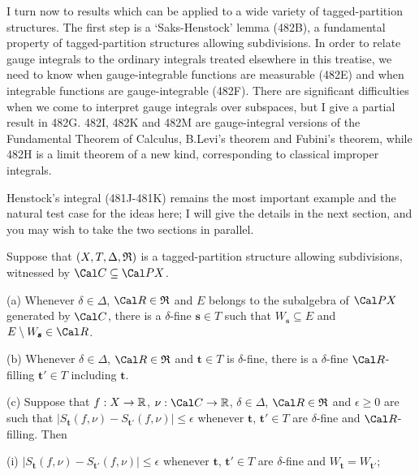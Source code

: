 
\def\closure{\mathop{\text{cl}}}
\def\Eta{\text{H}}

\def\chaptername{Gauge integrals}
\def\sectionname{General theory}


I turn now to results which can be applied to a wide variety of
tagged-partition structures.   The first step is a `Saks-Henstock'
lemma
(482B), a fundamental property of tagged-partition structures allowing
subdivisions.   In order to relate gauge integrals to the ordinary
integrals treated elsewhere in this treatise, we need to know when
gauge-integrable functions are measurable (482E) and when integrable
functions are gauge-integrable (482F).   There are significant
difficulties when we come to interpret gauge integrals over subspaces,
but I give a partial result in 482G.   482I, 482K and 482M
are gauge-integral versions of the Fundamental Theorem of Calculus,
B.Levi's theorem and Fubini's theorem, while 482H is a limit theorem of a
new kind, corresponding to classical improper integrals.

Henstock's integral (481J-481K) remains the most important example and
the natural test case for the ideas here;  I will give the details in
the next section, and you may wish to take the two sections in
parallel.

 Suppose that $(X,T,\Delta,\frak R)$ is a
tagged-partition structure allowing subdivisions,
witnessed by $\Cal C\subseteq\Cal PX$.

(a) Whenever $\delta\in\Delta$, $\Cal R\in\frak R$ and $E$ belongs to
the subalgebra of $\Cal PX$ generated by $\Cal C$, there is a
$\delta$-fine $\pmb{s}\in T$ such that $W_{\pmb{s}}\subseteq E$ and
$E\setminus W_{\pmb{s}}\in\Cal R$.

(b) Whenever $\delta\in\Delta$, $\Cal R\in\frak R$ and $\pmb{t}\in T$
is $\delta$-fine, there is a $\delta$-fine $\Cal R$-filling 
$\pmb{t}'\in T$ including $\pmb{t}$.

(c) Suppose that $f:X\to\Bbb R$, $\nu:\Cal C\to\Bbb R$,
$\delta\in\Delta$, $\Cal R\in\frak R$ and $\epsilon\ge 0$ are such
that
$|S_{\pmb{t}}(f,\nu)-S_{\pmb{t}'}(f,\nu)|\le\epsilon$ whenever
$\pmb{t}$, $\pmb{t}'\in T$ are $\delta$-fine and $\Cal R$-filling.
Then

\quad(i) $|S_{\pmb{t}}(f,\nu)-S_{\pmb{t}'}(f,\nu)|\le\epsilon$
whenever
$\pmb{t}$, $\pmb{t}'\in T$ are $\delta$-fine and
$W_{\pmb{t}}=W_{\pmb{t}'}$;

